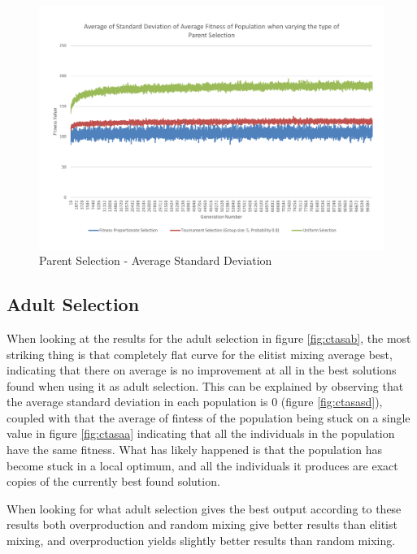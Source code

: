 \begin{figure}[thbp]
	\centerline{\includegraphics[width=\paperwidth]{figures/CircleTests/ParentSelection/CircleTestParentSelectionAverageStandardDeviation.pdf}}
	\caption{Parent Selection - Average Standard Deviation}
\end{figure}

\clearpage

\subsection{Adult Selection} %
\label{sub:adult_selection}

When looking at the results for the adult selection in figure \ref{fig:ctasab}, the most striking thing is that completely flat curve for the elitist mixing average best, indicating that there on average is no improvement at all in the best solutions found when using it as adult selection. This can be explained by observing that the average standard deviation in each population is 0 (figure \ref{fig:ctasasd}), coupled with that the average of fintess of the population being stuck on a single value in figure \ref{fig:ctasaa} indicating that all the individuals in the population have the same fitness. What has likely happened is that the population has become stuck in a local optimum, and all the individuals it produces are exact copies of the currently best found solution.

When looking for what adult selection gives the best output according to these results both overproduction and random mixing give better results than elitist mixing, and overproduction yields slightly better results than random mixing.

